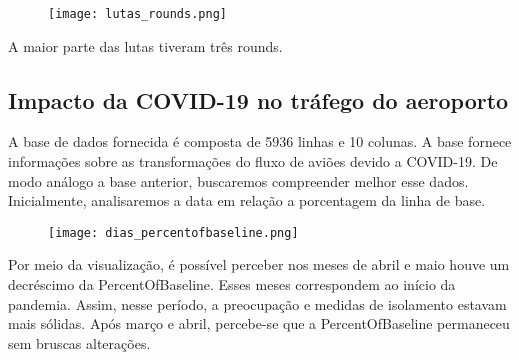 \documentclass{article}
\begin{document}
\begin{figure}[H] 
    \centering 
    \texttt{[image: lutas\_rounds.png]} 
\end{figure}

\par A maior parte das lutas tiveram três rounds. 

\subsection{Impacto da COVID-19 no tráfego do aeroporto}
A base de dados fornecida é composta de 5936 linhas e 10 colunas. A base fornece informações sobre as transformações do fluxo de aviões devido a COVID-19. De modo análogo a base anterior, buscaremos compreender melhor esse dados. Inicialmente, analisaremos a data em relação a porcentagem da linha de base.

\begin{figure}[H] 
    \centering 
    \texttt{[image: dias\_percentofbaseline.png]} 
\end{figure}

Por meio da visualização, é possível perceber nos meses de abril e maio houve um decréscimo da PercentOfBaseline. Esses meses correspondem ao início da pandemia. Assim, nesse período, a preocupação e medidas de isolamento estavam mais sólidas. Após março e abril, percebe-se que a PercentOfBaseline permaneceu sem bruscas alterações. 
\end{document}
